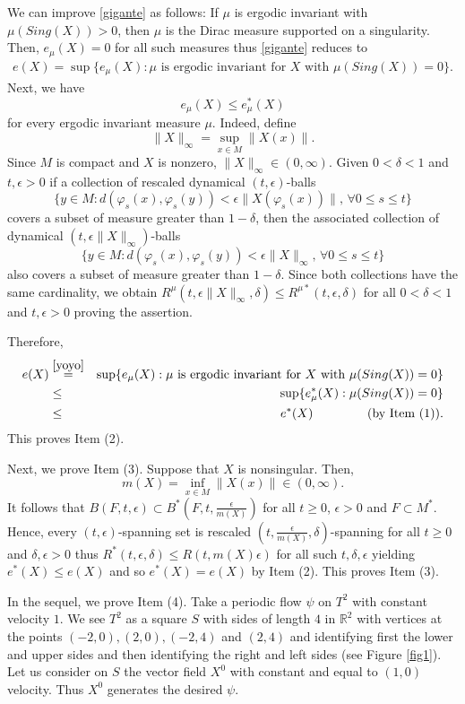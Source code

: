 \documentclass{amsart}
\numberwithin{equation}{section}
\begin{document}
We can improve \eqref{gigante} as follows:
If $\mu$ is ergodic invariant with $\mu(Sing(X))>0$, then
$\mu$ is the Dirac measure supported on a singularity. Then, $e_\mu(X)=0$ for all such measures thus \eqref{gigante} reduces to
\begin{multline}
\label{yoyo}
e(X)=\sup\big\{e_\mu(X):\mu\mbox{ is ergodic invariant for }X
\mbox{ with }\mu(Sing(X))=0\big\}.
\end{multline}
Next, we have
$$
e_\mu(X)\leq e^*_\mu(X)
$$
for every ergodic invariant measure $\mu$.
Indeed, define
\begin{equation}
\label{pqp}
\|X\|_\infty=\sup_{x\in M}\|X(x)\|.
\end{equation}
Since $M$ is compact and $X$ is nonzero, $\|X\|_\infty\in (0,\infty)$.
Given $0<\delta<1$ and $t,\epsilon>0$ if a collection of rescaled dynamical $(t,\epsilon)$-balls
$$
\{y\in M:d(\varphi_s(x),\varphi_s(y))<\epsilon\|X(\varphi_s(x))\|,\,\forall 0\leq s\leq t\}
$$
covers a subset of measure greater than $1-\delta$, then the associated collection of
dynamical $(t,\epsilon\|X\|_\infty)$-balls
$$
\{y\in M:d(\varphi_s(x),\varphi_s(y))<\epsilon\|X\|_\infty,\,\forall 0\leq s\leq t\}
$$
also covers a subset of measure greater than $1-\delta$.
Since both collections have the same cardinality, we obtain
$R^\mu(t,\epsilon\|X\|_\infty,\delta)\leq R^{\mu*}(t,\epsilon,\delta)$ for all $0<\delta<1$ and $t,\epsilon>0$ proving the assertion.


Therefore,
\begin{eqnarray*}
e(X)&\overset{\eqref{yoyo}}{=}&\sup\{e_\mu(X):\mu\mbox{ is ergodic invariant for }X\mbox{ with }\mu(Sing(X))=0\}\\
&\leq& \sup\{e^*_\mu(X):\mu(Sing(X))=0\}\\
&\leq&e^*(X)\quad\quad\quad\quad\mbox{ (by Item (1))}.
\end{eqnarray*}
This proves Item (2).

Next, we prove Item (3).
Suppose that $X$ is nonsingular.
Then,
$$
m(X)=\inf_{x\in M}\|X(x)\|\in (0,\infty).
$$
It follows that
$B(F,t,\epsilon)\subset B^*(F,t,\frac{\epsilon}{m(X)})$ for all $t\geq0$, $\epsilon>0$ and $F\subset M^*$.
Hence, every $(t,\epsilon)$-spanning set is rescaled $(t,\frac{\epsilon}{m(X)},\delta)$-spanning for all $t\geq0$ and $\delta,\epsilon>0$ thus
$R^*(t,\epsilon,\delta)\leq R(t,m(X)\epsilon)$ for all such $t,\delta,\epsilon$ yielding
$e^*(X)\leq e(X)$ and so $e^*(X)=e(X)$ by Item (2).
This proves Item (3).

In the sequel, we prove Item (4).
Take a periodic flow $\psi$ on $T^2$ with constant velocity $1$. We see $T^2$ as a square $S$ with sides of length $4$ in $\mathbb{R}^2$ with vertices at the points $(-2,0),(2,0),(-2,4)$ and $(2,4)$ and identifying first the lower and upper sides and then identifying the right and left sides (see Figure \ref{fig1}). Let us consider on $S$ the vector field $X^0$ with constant and equal to $(1,0)$ velocity. Thus $X^0$ generates the desired $\psi$.
\end{document}
